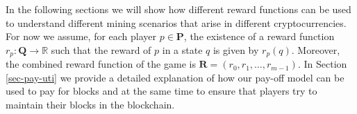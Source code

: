 \documentclass[a4paper,english,cleveref, autoref,numberwithinsect]{lipics-v2019}
\newcommand{\bP}{\mathbf{P}}
\newcommand{\bR}{\mathbf{R}}
\newcommand{\bQ}{\mathbf{Q}}
\begin{document}
In the following sections we will show how different reward functions can be used to understand different mining scenarios that arise in different cryptocurrencies. 
For now we assume, for each player $p \in \bP$, the existence of a reward function $r_p : \bQ \to \mathbb{R}$ such that the reward of $p$ in a state $q$ is given by $r_p(q)$. Moreover, the combined reward function of the game is $\bR = (r_0, r_1, \ldots, r_{m-1})$. In Section \ref{sec-pay-uti} we provide a detailed explanation of how our pay-off model can be used to pay for blocks and at the same time to ensure that players try to maintain their blocks in the blockchain.





\end{document}
